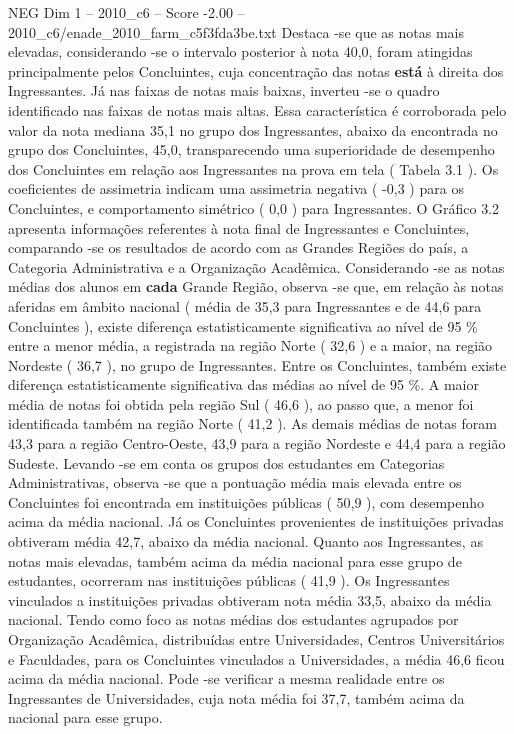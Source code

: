 \begin{textsample}{NEG Dim 1 – 2010\_c6 – Score -2.00 – 2010\_c6/enade\_2010\_farm\_c5f3fda3be.txt}
Destaca -se que as notas mais elevadas, considerando -se o intervalo posterior à nota 40,0, foram atingidas principalmente pelos Concluintes, cuja concentração das notas \textbf{está} à direita dos Ingressantes.
Já nas faixas de notas mais baixas, inverteu -se o quadro identificado nas faixas de notas mais altas.
Essa característica é corroborada pelo valor da nota mediana 35,1 no grupo dos Ingressantes, abaixo da encontrada no grupo dos Concluintes, 45,0, transparecendo uma superioridade de desempenho dos Concluintes em relação aos Ingressantes na prova em tela ( Tabela 3.1 ).
Os coeficientes de assimetria indicam uma assimetria negativa ( -0,3 ) para os Concluintes, e comportamento simétrico ( 0,0 ) para Ingressantes.
O Gráfico 3.2 apresenta informações referentes à nota final de Ingressantes e Concluintes, comparando -se os resultados de acordo com as Grandes Regiões do país, a Categoria Administrativa e a Organização Acadêmica.
Considerando -se as notas médias dos alunos em \textbf{cada} Grande Região, observa -se que, em relação às notas aferidas em âmbito nacional ( média de 35,3 para Ingressantes e de 44,6 para Concluintes ), existe diferença estatisticamente significativa ao nível de 95 \% entre a menor média, a registrada na região Norte ( 32,6 ) e a maior, na região Nordeste ( 36,7 ), no grupo de Ingressantes.
Entre os Concluintes, também existe diferença estatisticamente significativa das médias ao nível de 95 \%.
A maior média de notas foi obtida pela região Sul ( 46,6 ), ao passo que, a menor foi identificada também na região Norte ( 41,2 ).
As demais médias de notas foram 43,3 para a região Centro-Oeste, 43,9 para a região Nordeste e 44,4 para a região Sudeste.
Levando -se em conta os grupos dos estudantes em Categorias Administrativas, observa -se que a pontuação média mais elevada entre os Concluintes foi encontrada em instituições públicas ( 50,9 ), com desempenho acima da média nacional.
Já os Concluintes provenientes de instituições privadas obtiveram média 42,7, abaixo da média nacional.
Quanto aos Ingressantes, as notas mais elevadas, também acima da média nacional para esse grupo de estudantes, ocorreram nas instituições públicas ( 41,9 ).
Os Ingressantes vinculados a instituições privadas obtiveram nota média 33,5, abaixo da média nacional.
Tendo como foco as notas médias dos estudantes agrupados por Organização Acadêmica, distribuídas entre Universidades, Centros Universitários e Faculdades, para os Concluintes vinculados a Universidades, a média 46,6 ficou acima da média nacional.
Pode -se verificar a mesma realidade entre os Ingressantes de Universidades, cuja nota média foi 37,7, também acima da nacional para esse grupo.

\end{textsample}
